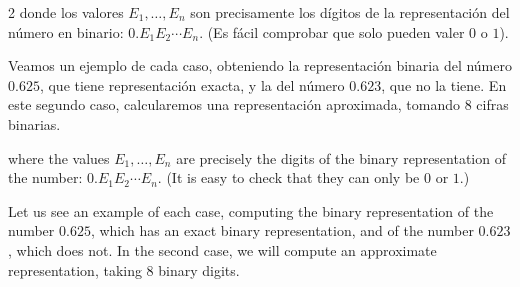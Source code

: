 \begin{paracol}{2}
donde los valores $E_1, \dots, E_n$ son precisamente los dígitos de la representación del número en binario: $0.E_1E_2\cdots E_n$. (Es fácil comprobar que solo pueden valer $0$ o $1$).

Veamos un ejemplo de cada caso, obteniendo la representación binaria del número $0.625$, que tiene representación exacta, y la del número $0.623$, que no la tiene. En este segundo caso, calcularemos una representación aproximada, tomando 8 cifras binarias.

\switchcolumn
where the values $E_1, \dots, E_n$ are precisely the digits of the binary representation of the number: $0.E_1E_2\cdots E_n$. (It is easy to check that they can only be $0$ or $1$.)

Let us see an example of each case, computing the binary representation of the number $0.625$, which has an exact binary representation, and of the number $0.623$, which does not. In the second case, we will compute an approximate representation, taking 8 binary digits.

\end{paracol}

